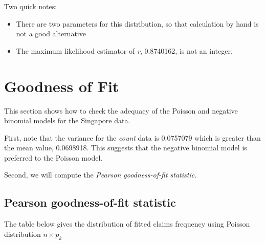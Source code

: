 \documentclass[]{book}
\providecommand{\tightlist}{%
  \setlength{\itemsep}{0pt}\setlength{\parskip}{0pt}}
\theoremstyle{definition}
\theoremstyle{definition}
\theoremstyle{definition}
\theoremstyle{remark}
\begin{document}
Two quick notes:

\begin{itemize}
\tightlist
\item
  There are two parameters for this distribution, so that calculation by
  hand is not a good alternative
\item
  The maximum likelihood estimator of \emph{r}, 0.8740162, is not an
  integer.
\end{itemize}

\section{Goodness of Fit}\label{goodness-of-fit}

This section shows how to check the adequacy of the Poisson and negative
binomial models for the Singapore data.

First, note that the variance for the \emph{count} data is 0.0757079
which is greater than the mean value, 0.0698918. This suggests that the
negative binomial model is preferred to the Poisson model.

Second, we will compute the \emph{Pearson goodness-of-fit statistic}.

\subsection{Pearson goodness-of-fit
statistic}\label{pearson-goodness-of-fit-statistic}

The table below gives the distribution of fitted claims frequency using
Poisson distribution \(n \times p_k\)
\end{document}
